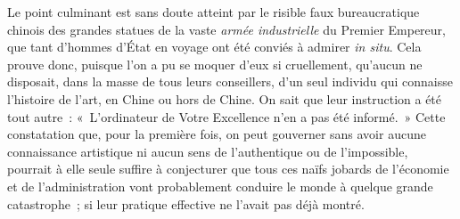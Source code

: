 \documentclass[french,twoside]{book} %
\def\bignobreak{\ifdim\lastskip<\bigskipamount
  \removelastskip\nopagebreak\bigskip\fi}
\newcommand{\labelblock}[1]{\bigbreak{\color{rubric}\noindent\textbf{#1}\par}\bignobreak}
\begin{document}
Le point culminant est sans doute atteint par le risible faux bureaucratique chinois des grandes statues de la vaste \emph{armée industrielle} du Premier Empereur, que tant d’hommes d’État en voyage ont été conviés à admirer \emph{in situ}. Cela prouve donc, puisque l’on a pu se moquer d’eux si cruellement, qu’aucun ne disposait, dans la masse de tous leurs conseillers, d’un seul individu qui connaisse l’histoire de l’art, en Chine ou hors de Chine. On sait que leur instruction a été tout autre : « L’ordinateur de Votre Excellence n’en a pas été informé. » Cette constatation que, pour la première fois, on peut gouverner sans avoir aucune connaissance artistique ni aucun sens de l’authentique ou de l’impossible, pourrait à elle seule suffire à conjecturer que tous ces naïfs jobards de l’économie et de l’administration vont probablement conduire le monde à quelque grande catastrophe ; si leur pratique effective ne l’avait pas déjà montré.\par

\labelblock{XVIII}
\end{document}
